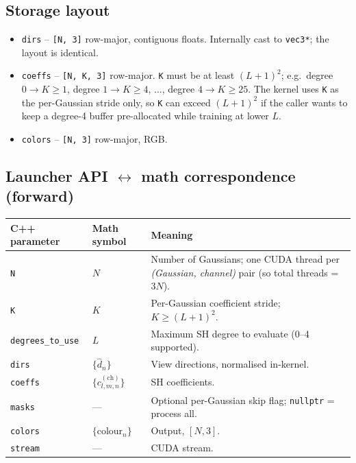 \documentclass[11pt]{article}
\begin{document}
\subsection{Storage layout}

\begin{itemize}
  \item \texttt{dirs} -- \texttt{[N, 3]} row-major, contiguous floats.
  Internally cast to \texttt{vec3*}; the layout is identical.
  \item \texttt{coeffs} -- \texttt{[N, K, 3]} row-major. \texttt{K} must
  be at least $(L+1)^{2}$; e.g.\ degree $0 \to K \ge 1$, degree
  $1 \to K \ge 4$, ..., degree $4 \to K \ge 25$. The kernel uses
  \texttt{K} as the per-Gaussian stride only, so \texttt{K} can exceed
  $(L+1)^{2}$ if the caller wants to keep a degree-4 buffer
  pre-allocated while training at lower $L$.
  \item \texttt{colors} -- \texttt{[N, 3]} row-major, RGB.
\end{itemize}

\subsection{Launcher API \texorpdfstring{$\leftrightarrow$}{<->} math correspondence (forward)}

\begin{center}
\begin{tabular}{l l p{8.0cm}}
\hline
\textbf{C++ parameter} & \textbf{Math symbol} & \textbf{Meaning} \\
\hline
\texttt{N} & $N$ & Number of Gaussians; one CUDA thread per
\emph{(Gaussian, channel)} pair (so total threads = $3N$). \\
\texttt{K} & $K$ & Per-Gaussian coefficient stride; $K \ge (L+1)^{2}$. \\
\texttt{degrees\_to\_use} & $L$ & Maximum SH degree to evaluate (0--4
supported). \\
\texttt{dirs} & $\{\hat d_n\}$ & View directions, normalised in-kernel. \\
\texttt{coeffs} & $\{c_{l,m,n}^{(\text{ch})}\}$ & SH coefficients. \\
\texttt{masks} & --- & Optional per-Gaussian skip flag;
\texttt{nullptr} = process all. \\
\texttt{colors} & $\{\text{colour}_n\}$ & Output, $[N, 3]$. \\
\texttt{stream} & --- & CUDA stream. \\
\hline
\end{tabular}
\end{center}
\end{document}
